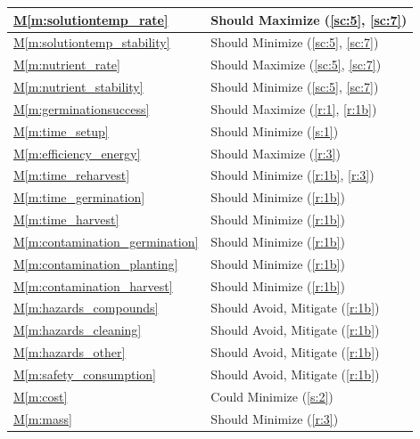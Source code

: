 \documentclass{../tex/report}
\newcommand{\mref}[1]{\hyperref[#1]{M\ref{#1}}}
\begin{document}
\begin{tabular}{|l|p{14.35cm}|}
    \hline
    \mref{m:solutiontemp_rate} & Should Maximize \hfill (\ref{sc:5}, \ref{sc:7}) \\
    \hline
    \mref{m:solutiontemp_stability} & Should Minimize \hfill (\ref{sc:5}, \ref{sc:7}) \\
    \hline
    \mref{m:nutrient_rate} & Should Maximize \hfill (\ref{sc:5}, \ref{sc:7}) \\
    \hline
    \mref{m:nutrient_stability} & Should Minimize \hfill (\ref{sc:5}, \ref{sc:7}) \\
    \hline
    \mref{m:germinationsuccess} & Should Maximize \hfill (\ref{r:1}, \ref{r:1b}) \\
    \hline
    \mref{m:time_setup} & Should Minimize \hfill (\ref{s:1}) \\
    \hline
    \mref{m:efficiency_energy} & Should Maximize \hfill (\ref{r:3}) \\
    \hline
    \mref{m:time_reharvest} & Should Minimize \hfill (\ref{r:1b}, \ref{r:3}) \\
    \hline
    \mref{m:time_germination} & Should Minimize \hfill (\ref{r:1b}) \\
    \hline
    \mref{m:time_harvest} & Should Minimize \hfill (\ref{r:1b}) \\
    \hline
    \mref{m:contamination_germination} & Should Minimize \hfill (\ref{r:1b}) \\
    \hline
    \mref{m:contamination_planting} & Should Minimize \hfill (\ref{r:1b}) \\
    \hline
    \mref{m:contamination_harvest} & Should Minimize \hfill (\ref{r:1b}) \\
    \hline
    \mref{m:hazards_compounds} & Should Avoid, Mitigate \hfill (\ref{r:1b}) \\
    \hline
    \mref{m:hazards_cleaning} & Should Avoid, Mitigate \hfill (\ref{r:1b}) \\
    \hline
    \mref{m:hazards_other} & Should Avoid, Mitigate \hfill (\ref{r:1b}) \\
    \hline
    \mref{m:safety_consumption} & Should Avoid, Mitigate \hfill (\ref{r:1b}) \\
    \hline
    \mref{m:cost} & Could Minimize \hfill (\ref{s:2}) \\
    \hline
    \mref{m:mass} & Should Minimize \hfill (\ref{r:3}) \\
    \hline
\end{tabular}

\end{document}
